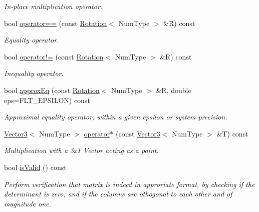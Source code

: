 \begin{DoxyCompactItemize}
\begin{DoxyCompactList}\small\item\em In-\/place multiplication operator. \end{DoxyCompactList}\item 
bool \hyperlink{singletonscrews_1_1_rotation_a1785277bfd2d6cb12d460ec56c39766b}{operator==} (const \hyperlink{singletonscrews_1_1_rotation}{Rotation}$<$ Num\+Type $>$ \&R) const 
\begin{DoxyCompactList}\small\item\em Equality operator. \end{DoxyCompactList}\item 
bool \hyperlink{singletonscrews_1_1_rotation_a456c2a098b8e750ad26f8a6f3580693a}{operator!=} (const \hyperlink{singletonscrews_1_1_rotation}{Rotation}$<$ Num\+Type $>$ \&R) const 
\begin{DoxyCompactList}\small\item\em Inequality operator. \end{DoxyCompactList}\item 
bool \hyperlink{singletonscrews_1_1_rotation_a71be5e82832ee4fcd3dd15dbb76c2d88}{approx\+Eq} (const \hyperlink{singletonscrews_1_1_rotation}{Rotation}$<$ Num\+Type $>$ \&R, double eps=F\+L\+T\+\_\+\+E\+P\+S\+I\+L\+O\+N) const 
\begin{DoxyCompactList}\small\item\em Approximal equality operator, within a given epsilon or system precision. \end{DoxyCompactList}\item 
\hypertarget{singletonscrews_1_1_rotation_ab6d1e4186d122c72c40487f14a4ad855}{\hyperlink{singletonscrews_1_1_translation}{Vector3}$<$ Num\+Type $>$ \hyperlink{singletonscrews_1_1_rotation_ab6d1e4186d122c72c40487f14a4ad855}{operator$\ast$} (const \hyperlink{singletonscrews_1_1_translation}{Vector3}$<$ Num\+Type $>$ \&T) const }\label{singletonscrews_1_1_rotation_ab6d1e4186d122c72c40487f14a4ad855}

\begin{DoxyCompactList}\small\item\em Multiplication with a 3x1 Vector acting as a point. \end{DoxyCompactList}\item 
\hypertarget{singletonscrews_1_1_rotation_a2e20f50810052017fe422e207f626df9}{bool \hyperlink{singletonscrews_1_1_rotation_a2e20f50810052017fe422e207f626df9}{is\+Valid} () const }\label{singletonscrews_1_1_rotation_a2e20f50810052017fe422e207f626df9}

\begin{DoxyCompactList}\small\item\em Perform verification that matrix is indeed in approriate format, by checking if the determinant is zero, and if the columns are othogonal to each other and of magnitude one. \end{DoxyCompactList}\end{DoxyCompactItemize}
